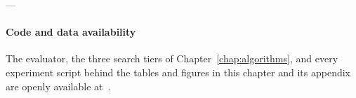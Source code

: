 \vspace{2.8cm}

---

\paragraph{Code and data availability}
\label{sec:exp:availability}

The evaluator, the three search tiers of Chapter~\ref{chap:algorithms}, and every experiment script behind the tables and figures in this chapter and its appendix are openly available at~\cite{Flechtner2026Entanglement}.
